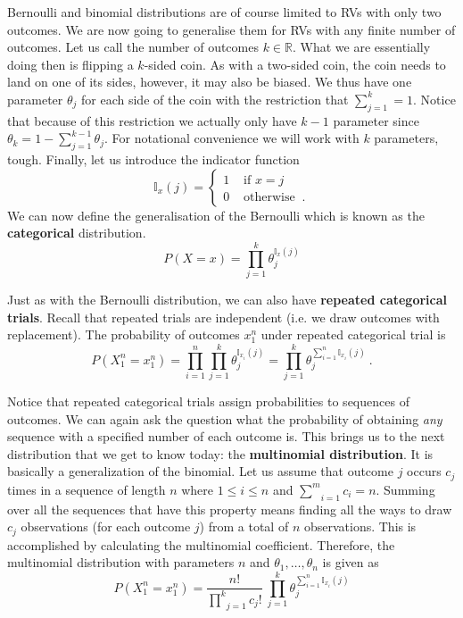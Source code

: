 Bernoulli and binomial distributions are of course limited to RVs with only two outcomes. We are now going to generalise them for 
RVs with any finite number of outcomes. Let us call the number of outcomes $ k \in \mathbb{R} $. What we are essentially doing then
is flipping a $ k $-sided coin. As with a two-sided coin, the coin needs to land on one of its sides, however, it may also be biased.
We thus have one parameter $ \theta_{j} $ for each side of the coin with the restriction that $ \sum_{j=1}^{k} = 1 $. Notice that
because of this restriction we actually only have $ k-1 $ parameter since $ \theta_{k} = 1 - \sum_{j=1}^{k-1}\theta_{j} $. For notational
convenience we will work with $ k $ parameters, tough. Finally, let us introduce the indicator function
\begin{equation}
\mathbb{I}_{x}(j) = \begin{cases}
1 & \mbox{ if } x = j \\
0 & \mbox{ otherwise } \ . 
\end{cases}
\end{equation}
We can now define the generalisation of the Bernoulli which is known as the \textbf{categorical}\label{lab:categorical} distribution.
\begin{equation}
P(X=x) = \prod_{j=1}^{k}\theta_{j}^{\mathbb{I}_{x}(j)}
\end{equation}

Just as with the Bernoulli distribution, we can also have \textbf{repeated categorical trials}. Recall that repeated trials
are independent (i.e. we draw outcomes with replacement). The probability of outcomes
$ x_{1}^{n} $ under repeated categorical trial is
\begin{equation}
P(X_{1}^{n} = x_{1}^{n}) = \prod_{i=1}^{n} \prod_{j=1}^{k}\theta_{j}^{\mathbb{I}_{x_{i}}(j)} = \prod_{j=1}^{k}\theta_{j}^{\sum_{i=1}^{n}\mathbb{I}_{x_{i}}(j)} \ .
\end{equation} 

Notice that repeated categorical trials assign probabilities to sequences of outcomes. We can again ask the question what the
probability of obtaining \textit{any} sequence with a specified number of each outcome is. This brings us to the next distribution that we get to know today: the \textbf{multinomial distribution}. It is basically a generalization
of the binomial. Let us assume that outcome $ j $ occurs $ c_{j} $ times in a sequence of length $ n $ where
$ 1 \leq i \leq n $ and $ \underset{i=1}{\overset{m}{\sum}}c_{i} = n $. Summing over all the sequences that have this property means finding all the ways
to draw $ c_{j} $ observations (for each outcome $ j $) from a total of $ n $ observations. This is accomplished by calculating the multinomial coefficient. 
Therefore, the multinomial distribution with parameters $ n $ and 
$ \theta_{1}, \ldots, \theta_{n} $ is given as 
\begin{equation}
P(X_{1}^{n} = x_{1}^{n}) = \dfrac{n!}{\underset{j=1}{\overset{k}{\prod}}c_{j}!}~\underset{j=1}{\overset{k}{\prod}} \theta_{j}^{\sum_{i=1}^{n}\mathbb{I}_{x_{i}}(j)}
\end{equation}

